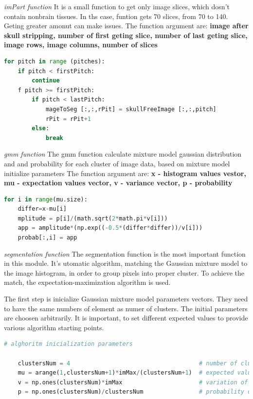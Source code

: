\textit{imPart function}
It is a small function to get only image slices, which dosn't contain nonbrain tissues. In ths case, funtion gets 70 slices, from 70 to 140. Geting greater amonut can make issues. 
The function argument are: \textbf{image after skull stripping, number of first geting slice, number of last geting slice, image rows, image columns, number of slices}
\\
\begin{lstlisting}[language=Python, caption = Geting part of image to segmentation]
for pitch in range (pitches):
    if pitch < firstPitch:
        continue
    f pitch >= firstPitch:
        if pitch < lastPitch:
            mageToSeg [:,:,rPit] = skullFreeImage [:,:,pitch]
            rPit = rPit+1
        else:
            break
\end{lstlisting}


\textit{gmm function}
The gmm function calculate mixture model gaussian distribution and and probability for each cluster of image data, based on mixture model initialize parameters
The function argument are: \textbf{x - histogram values vestor, mu - expectation values vector, v - variance vector, p - probability}

\begin{lstlisting}[language=Python, caption = gmm function]
for i in range(mu.size):
    differ=x-mu[i]
    mplitude = p[i]/(math.sqrt(2*math.pi*v[i]))
    app = amplitude*(np.exp((-0.5*(differ*differ))/v[i]))
    probab[:,i] = app	
\end{lstlisting}


\textit{segmentation function}
The segmentation function is the most important function in this module. It's utomatic algorithm, matching the Gaussian mixture model to the image histogram, in order to group pixels into proper cluster. To achieve the match, the expectation-maximization algorithm is used. 

The first step is inicialize Gaussian mixture model parameters vectors. They need to have the same numbers of element as numer of clusters. The initial parameters are choosen arbitrarily. It is important, to set different expected values to provide various algorithm starting points. 

\begin{lstlisting}[language=Python, caption = Segmentation - inicialization parameters]
# alghoritm inicialization parameters

    clustersNum = 4										# number of clusters
    mu = arange(1,clustersNum+1)*imMax/(clustersNum+1)	# expected value of each clusters
    v = np.ones(clustersNum)*imMax						# variation of each clusters
    p = np.ones(clustersNum)/clustersNum				# probability of each clusters
\end{lstlisting}

